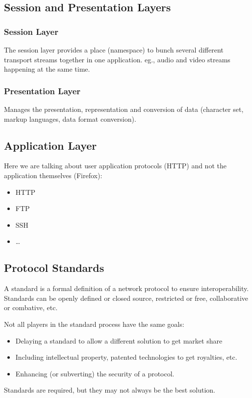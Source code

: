\subsection{Session and Presentation Layers}\label{sub:session_and_presentation_layers}

\subsubsection{Session Layer}\label{ssub:session_layer}

The session layer provides a place (namespace) to bunch several different transport streams together in one application.
eg., audio and video streams happening at the same time.

\subsubsection{Presentation Layer}\label{ssub:presentation_layer}

Manages the presentation, representation and conversion of data (character set, markup languages, data format conversion).

\subsection{Application Layer}\label{sub:application_layer}

Here we are talking about user application protocols (HTTP) and not the application themselves (Firefox):
\begin{itemize}
	\item HTTP
	\item FTP
	\item SSH
	\item \dots
\end{itemize}

\subsection{Protocol Standards}\label{sub:protocol_standards}

A standard is a formal definition of a network protocol to ensure interoperability.
Standards can be openly defined or closed source, restricted or free, collaborative or combative, etc.

Not all players in the standard process have the same goals:
\begin{itemize}
	\item Delaying a standard to allow a different solution to get market share
	\item Including intellectual property, patented technologies to get royalties, etc.
	\item Enhancing (or subverting) the security of a protocol.
\end{itemize}
Standards are required, but they may not always be the best solution.

